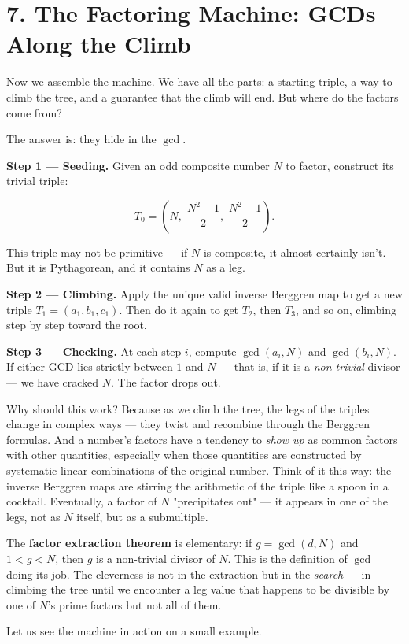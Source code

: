\documentclass[12pt, letterpaper, openany]{book}
\theoremstyle{definition}
\theoremstyle{remark}
\begin{document}
\section*{7. The Factoring Machine: GCDs Along the Climb}


Now we assemble the machine. We have all the parts: a starting triple, a way to climb the tree, and a guarantee that the climb will end. But where do the factors come from?

The answer is: they hide in the $\gcd$.

\textbf{Step 1 --- Seeding.} Given an odd composite number $N$ to factor, construct its trivial triple:

\[
T_0 = \left(N,\;\frac{N^2 - 1}{2},\;\frac{N^2 + 1}{2}\right).
\]

This triple may not be primitive --- if $N$ is composite, it almost certainly isn't. But it is Pythagorean, and it contains $N$ as a leg.

\textbf{Step 2 --- Climbing.} Apply the unique valid inverse Berggren map to get a new triple $T_1 = (a_1, b_1, c_1)$. Then do it again to get $T_2$, then $T_3$, and so on, climbing step by step toward the root.

\textbf{Step 3 --- Checking.} At each step $i$, compute $\gcd(a_i, N)$ and $\gcd(b_i, N)$. If either GCD lies strictly between $1$ and $N$ --- that is, if it is a \textit{non-trivial} divisor --- we have cracked $N$. The factor drops out.

Why should this work? Because as we climb the tree, the legs of the triples change in complex ways --- they twist and recombine through the Berggren formulas. And a number's factors have a tendency to \textit{show up} as common factors with other quantities, especially when those quantities are constructed by systematic linear combinations of the original number. Think of it this way: the inverse Berggren maps are stirring the arithmetic of the triple like a spoon in a cocktail. Eventually, a factor of $N$ "precipitates out" --- it appears in one of the legs, not as $N$ itself, but as a submultiple.

The \textbf{factor extraction theorem} is elementary: if $g = \gcd(d, N)$ and $1 < g < N$, then $g$ is a non-trivial divisor of $N$. This is the definition of $\gcd$ doing its job. The cleverness is not in the extraction but in the \textit{search} --- in climbing the tree until we encounter a leg value that happens to be divisible by one of $N$'s prime factors but not all of them.

Let us see the machine in action on a small example.
\end{document}
